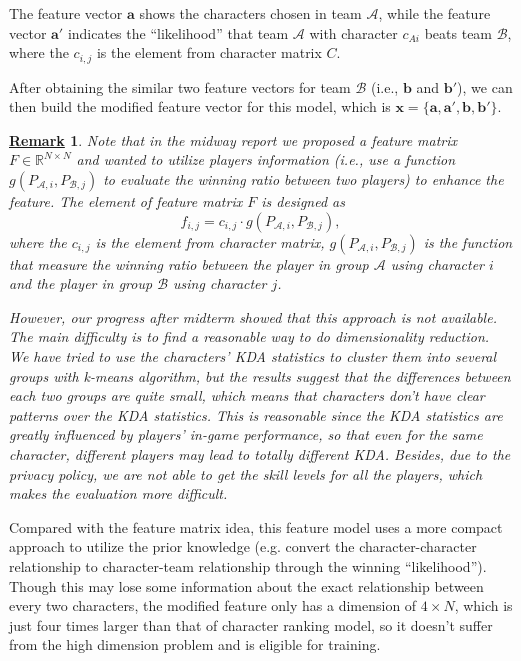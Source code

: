 \documentclass{article} %
\newtheorem{remark}{\underline{Remark}}
\begin{document}
The feature vector $\mathbf{a}$ shows the characters chosen in team $\mathcal{A}$, while the feature vector $\mathbf{a'}$ indicates the ``likelihood'' that team $\mathcal{A}$ with character $c_{Ai}$ beats team $\mathcal{B}$, where the $c_{i,j}$ is the element from character matrix $C$.

After obtaining the similar two feature vectors for team $\mathcal{B}$ (i.e., $\mathbf{b}$ and $\mathbf{b'}$), we can then build the modified feature vector for this model, which is $\textbf{x}=\{\mathbf{a},\mathbf{a'},\mathbf{b},\mathbf{b'}\}$.

\begin{remark}
Note that in the midway report we proposed a feature matrix $F \in \mathbb{R}^{N\times N}$ and wanted to utilize players information (i.e., use a function $g(P_{\mathcal{A},i},P_{\mathcal{B},j})$ to evaluate the winning ratio between two players) to enhance the feature. The element of feature matrix $F$ is designed as
\begin{equation*}
f_{i,j}=c_{i,j} \cdot g(P_{\mathcal{A},i},P_{\mathcal{B},j}),
\end{equation*}
where the $c_{i,j}$ is the element from character matrix, $g(P_{\mathcal{A},i},P_{\mathcal{B},j})$ is the function that measure the winning ratio between the player in group $\mathcal{A}$ using character $i$ and the player in group $\mathcal{B}$ using character $j$.

However, our progress after midterm showed that this approach is not available. The main difficulty is to find a reasonable way to do dimensionality reduction. We have tried to use the characters' KDA statistics to cluster them into several groups with k-means algorithm, but the results suggest that the differences between each two groups are quite small, which means that characters don't have clear patterns over the KDA statistics. This is reasonable since the KDA statistics are greatly influenced by players' in-game performance, so that even for the same character, different players may lead to totally different KDA. Besides, due to the privacy policy, we are not able to get the skill levels for all the players, which makes the evaluation more difficult.
\end{remark}

Compared with the feature matrix idea, this feature model uses a more compact approach to utilize the prior knowledge (e.g. convert the character-character relationship to character-team relationship through the winning ``likelihood''). Though this may lose some information about the exact relationship between every two characters, the modified feature only has a dimension of $4\times N$, which is just four times larger than that of character ranking model, so it doesn't suffer from the high dimension problem and is eligible for training.
\end{document}

